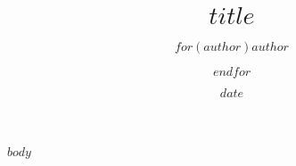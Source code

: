 \documentclass[$if(font-size)$$font-size$$else$12pt$endif$, $if(paper-format)$$paper-format$$else$a4paper$endif$]{article}
\title{$title$}
\author{$for(author)$$author$\and$endfor$}
\date{$date$}
\begin{document}
\onehalfspacing %

$body$
\end{document}
